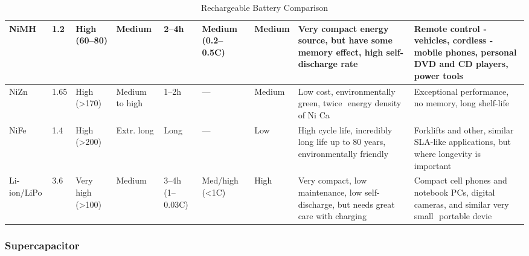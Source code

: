 \documentclass[../../document]{subfiles}
\begin{document}
\begin{sidewaystable}
\begin{center}
\begin{tabular}{p{.06\textheight}p{.06\textheight}p{.05\textheight}p{.05\textheight}p{.06\textheight}p{.09\textheight}p{.05\textheight}p{.22\textheight}p{.2\textheight}}
			\midrule
			NiMH & 1.2 & High (60–80) & Medium & 2–4\unit{\hour} & Medium (0.2–0.5C)
					 & Medium & Very compact energy source, but have some memory effect,
			high self-discharge rate & Remote control ­ vehicles, cordless ­ mobile
			phones, personal DVD and CD players, power tools\\ 
			\midrule
			NiZn & 1.65 & High
			(>170) & Medium to high & 1–2\unit{\hour} & --- & Medium & Low cost,
			environmentally green, twice ­ energy density of Ni­ Ca & Exceptional
			performance, no memory, long shelf-life\\
			\midrule
			NiFe & 1.4 & High (>200)  & Extr. long & Long & --- & Low & High
			cycle life, incredibly long life up to 80 years, environmentally friendly
					 & Forklifts and other, similar SLA-like applications, but where
			longevity is important\\ 
			\midrule
			Li-ion/LiPo & 3.6 & Very high (>100) & Medium &
			3–4\unit{\hour} (1–0.03C) &  Med/high (<1C) & High & Very compact, low
			maintenance, low self-discharge, but needs great care with charging &
			Compact cell phones and notebook PCs, digital cameras, and similar very
			small ­ portable devie\\
			\bottomrule
		\end{tabular}
	\end{center}
	\caption{Rechargeable Battery Comparison \cite[p. 284]{practical_electronics}}
\end{sidewaystable}

\subsubsection{Supercapacitor}
\end{document}
